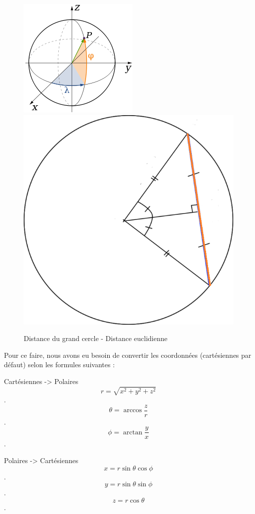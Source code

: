 \begin{figure}[h!]
\centering
\includegraphics[scale=0.5]{images/great-circle-distance-img.png}
\includegraphics[scale=0.2]{images/distance-euclidienne.png}
\caption{Distance du grand cercle - Distance euclidienne}
\label{fig:Distance du grand cercle}
\end{figure}

Pour ce faire, nous avons eu besoin de convertir les coordonnées (cartésiennes par défaut) selon les formules suivantes \cite{conversion} : 

Cartésiennes -> Polaires
\[
   r = \sqrt{x^2 +y^2 + z^2} 
  \].
   \[
  \theta = \arccos\frac{z}{r}
    \].
     \[
  \phi = \arctan\frac{y}{x}
\].

Polaires -> Cartésiennes
\[
   x = r\sin{\theta}\cos{\phi}
  \].   
   \[
   y = r \sin{\theta}\sin{\phi}
   \]. 
    \[
   z = r\cos{\theta}
\].

